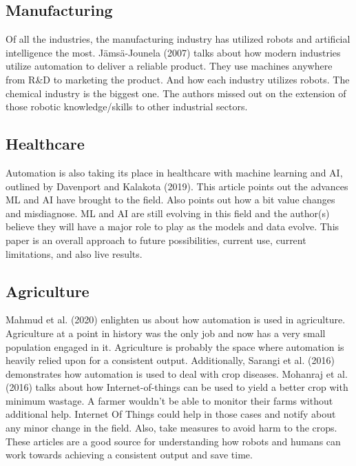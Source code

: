 \documentclass[
  english,
  man]{apa7}
\begin{document}
\hypertarget{manufacturing}{%
\subsection{Manufacturing}\label{manufacturing}}

Of all the industries, the manufacturing industry has utilized robots and artificial intelligence the most. Jämsä-Jounela (2007) talks about how modern industries utilize automation to deliver a reliable product. They use machines anywhere from R\&D to marketing the product. And how each industry utilizes robots. The chemical industry is the biggest one. The authors missed out on the extension of those robotic knowledge/skills to other industrial sectors.

\hypertarget{healthcare}{%
\subsection{Healthcare}\label{healthcare}}

Automation is also taking its place in healthcare with machine learning and AI, outlined by Davenport and Kalakota (2019). This article points out the advances ML and AI have brought to the field. Also points out how a bit value changes and misdiagnose. ML and AI are still evolving in this field and the author(s) believe they will have a major role to play as the models and data evolve. This paper is an overall approach to future possibilities, current use, current limitations, and also live results.

\hypertarget{agriculture}{%
\subsection{Agriculture}\label{agriculture}}

Mahmud et al. (2020) enlighten us about how automation is used in agriculture. Agriculture at a point in history was the only job and now has a very small population engaged in it. Agriculture is probably the space where automation is heavily relied upon for a consistent output. Additionally, Sarangi et al. (2016) demonstrates how automation is used to deal with crop diseases. Mohanraj et al. (2016) talks about how Internet-of-things can be used to yield a better crop with minimum wastage. A farmer wouldn't be able to monitor their farms without additional help. Internet Of Things could help in those cases and notify about any minor change in the field. Also, take measures to avoid harm to the crops. These articles are a good source for understanding how robots and humans can work towards achieving a consistent output and save time.
\end{document}
